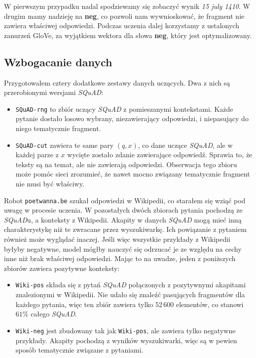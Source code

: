 \normalsize
W pierwszym przypadku nadal spodziewamy się zobaczyć wynik \textit{15 july 1410}. W drugim mamy nadzieję na \textbf{neg}, co pozwoli nam wywnioskować, że fragment nie zawiera właściwej odpowiedzi. Podczas uczenia dalej korzystamy z ustalonych zanurzeń GloVe, za wyjątkiem wektora dla słowa \textbf{neg}, który jest optymalizowany.

\subsection{Wzbogacanie danych}

Przygotowałem cztery dodatkowe zestawy danych uczących. Dwa z nich są przerobionymi wersjami \textit{SQuAD}:

\begin{itemize}
    \item \texttt{SQuAD-rng} to zbiór uczący \textit{SQuAD} z pomieszanymi kontekstami. Każde pytanie dostało losowo wybrany, niezawierający odpowiedzi, i niepasujący do niego tematycznie fragment.

    \item \texttt{SQuAD-cut} zawiera te same pary $(q, x)$, co dane uczące \textit{SQuAD}, ale w każdej parze z $x$ wycięte zostało zdanie zawierające odpowiedź. Sprawia to, że teksty są na temat, ale nie zawierają odpowiedzi. Obserwacja tego zbioru może pomóc sieci zrozumieć, że nawet mocno związany tematycznie fragment nie musi być właściwy.
\end{itemize}

Robot \texttt{poetwanna.be} szukał odpowiedzi w Wikipedii, co starałem się wziąć pod uwagę w procesie uczenia. W pozostałych dwóch zbiorach pytania pochodzą ze \textit{SQuAD}u, a konteksty z Wikipedii. Akapity w danych \textit{SQuAD} mogą mieć inną charakterystykę niż te zwracane przez wyszukiwarkę. Ich powiązanie z pytaniem również może wyglądać inaczej. Jeśli więc wszystkie przykłady z Wikipedii byłyby negatywne, model mógłby nauczyć się odrzucać je ze względu na cechy inne niż brak właściwej odpowiedzi. Mając to na uwadze, jeden z poniższych zbiorów zawiera pozytywne konteksty:

\begin{itemize}
    \item \texttt{Wiki-pos} składa się z pytań \textit{SQuAD} połączonych z pozytywnymi akapitami znalezionymi w Wikipedii. Nie udało się znaleźć pasujących fragmentów dla każdego pytania, więc ten zbiór zawiera tylko 52\,600 elementów, co stanowi $61\%$ całego \textit{SQuAD}.
    \item \texttt{Wiki-neg} jest zbudowany tak jak \texttt{Wiki-pos}, ale zawiera tylko negatywne przykłady. Akapity pochodzą z wyników wyszukiwarki, więc są w pewien sposób tematycznie związane z pytaniami.
\end{itemize}

